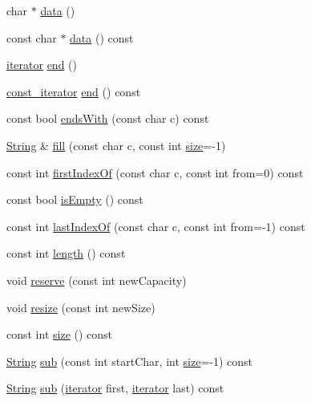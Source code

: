 \begin{DoxyCompactItemize}
\item 
char $\ast$ \hyperlink{classprism_1_1_string_aa70973a523fcfbaa608645085f004d29}{data} ()
\item 
const char $\ast$ \hyperlink{classprism_1_1_string_a8f28ba12d030e7f28fe533901dad97ea}{data} () const 
\item 
\hyperlink{classprism_1_1_string_adacc7975837e5fff95d70690777fb330}{iterator} \hyperlink{classprism_1_1_string_a66cac7d74458715877d381c036bd1698}{end} ()
\item 
\hyperlink{classprism_1_1_string_a8b46f0fbe9c5c94ba892975242e3ab68}{const\+\_\+iterator} \hyperlink{classprism_1_1_string_ada5833ed658db9ed7cd0d847b727b1c3}{end} () const 
\item 
const bool \hyperlink{classprism_1_1_string_aa478bddcdb9ea30ba0a8d1389296607c}{ends\+With} (const char c) const 
\item 
\hyperlink{classprism_1_1_string}{String} \& \hyperlink{classprism_1_1_string_ae7d89942e4c7ab431331400eb5489854}{fill} (const char c, const int \hyperlink{classprism_1_1_string_a603b5a90681d43adf7c6c29018e0300c}{size}=-\/1)
\item 
const int \hyperlink{classprism_1_1_string_af3b71f73c184a5f14ef91ad6e56187b7}{first\+Index\+Of} (const char c, const int from=0) const 
\item 
const bool \hyperlink{classprism_1_1_string_a2f2960f59d644b2d0f390a090fa7a4ef}{is\+Empty} () const 
\item 
const int \hyperlink{classprism_1_1_string_a94a9059dc86dcfcbf409ffc83f3da2a8}{last\+Index\+Of} (const char c, const int from=-\/1) const 
\item 
const int \hyperlink{classprism_1_1_string_a7dfc72427863cefb9fe883599272ca7d}{length} () const 
\item 
void \hyperlink{classprism_1_1_string_aed752cc8c9e59a7b2366b85ab20a656b}{reserve} (const int new\+Capacity)
\item 
void \hyperlink{classprism_1_1_string_a77b3580eba01007afc7089cfd334abd5}{resize} (const int new\+Size)
\item 
const int \hyperlink{classprism_1_1_string_a603b5a90681d43adf7c6c29018e0300c}{size} () const 
\item 
\hyperlink{classprism_1_1_string}{String} \hyperlink{classprism_1_1_string_a4249170c6ee2d8d409e7b2c1c66092e4}{sub} (const int start\+Char, int \hyperlink{classprism_1_1_string_a603b5a90681d43adf7c6c29018e0300c}{size}=-\/1) const 
\item 
\hyperlink{classprism_1_1_string}{String} \hyperlink{classprism_1_1_string_aea30772127a513ced41ebd44fe3d48f0}{sub} (\hyperlink{classprism_1_1_string_adacc7975837e5fff95d70690777fb330}{iterator} first, \hyperlink{classprism_1_1_string_adacc7975837e5fff95d70690777fb330}{iterator} last) const 

\end{DoxyCompactItemize}
